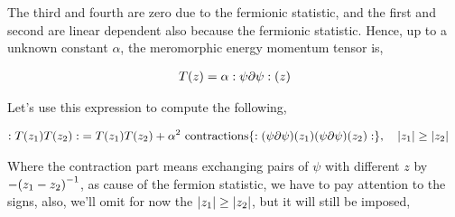 The third and fourth are zero due to the fermionic statistic, and the first and second are linear dependent also because the 
fermionic statistic. Hence, up to a unknown constant $\alpha$, the meromorphic energy momentum tensor is,

\begin{align*}
    T\qty(z)=\alpha:\psi\partial\psi:\qty(z)
\end{align*}

Let's use this expression to compute the following,

\begin{align*}
    \cnord{T\qty(z_1) T\qty(z_2)}&=T\qty(z_1)T\qty(z_2)+\alpha^2\textnormal{ contractions}\qty{\cnord{\qty(\psi\partial\psi)\qty(z_1)\qty(\psi\partial\psi)\qty(z_2)}},\ \ \ \abs{z_1}\geq \abs{z_2}
\end{align*}

Where the contraction part means exchanging pairs of $\psi$ with different $z$ by $-\qty(z_1-z_2)^{-1}$, as cause of the fermion 
statistic, we have to pay attention to the signs, also, we'll omit for now the $\abs{z_1}\geq\abs{z_2}$, but it will still be imposed, 

